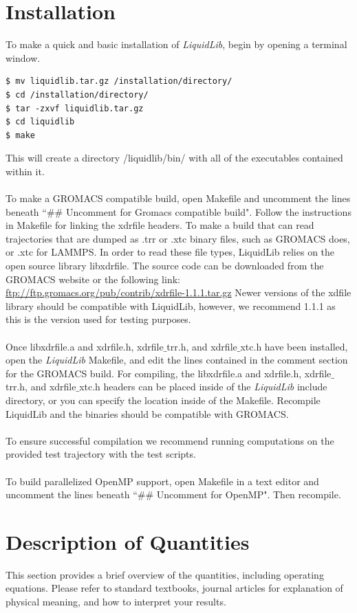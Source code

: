 \documentclass{article}
\begin{document}
\section{Installation}
To make a quick and basic installation of \textit{LiquidLib}, begin by opening a terminal window.
\begin{lstlisting}[style=BashInputStyle]
$ mv liquidlib.tar.gz /installation/directory/
$ cd /installation/directory/
$ tar -zxvf liquidlib.tar.gz
$ cd liquidlib
$ make
\end{lstlisting}
This will create a directory /liquidlib/bin/ with all of the executables contained within it.
\\
\\
To make a GROMACS compatible build, open Makefile and uncomment the lines beneath ``$\#\#$ Uncomment for Gromacs compatible build".  Follow the instructions in Makefile for linking the xdrfile headers. To make a build that can read trajectories that are dumped as .trr or .xtc binary files, such as GROMACS does, or .xtc for LAMMPS.  In order to read these file types, LiquidLib relies on the open source library libxdrfile.  The source code can be downloaded from the GROMACS website or the following link: \url{ftp://ftp.gromacs.org/pub/contrib/xdrfile-1.1.1.tar.gz} Newer versions of the xdfile library should be compatible with LiquidLib, however, we recommend 1.1.1 as this is the version used for testing purposes.
\\
\\
Once libxdrfile.a and xdrfile.h, xdrfile$\_$trr.h, and xdrfile$\_$xtc.h have been installed, open the \textit{LiquidLib} Makefile, and edit the lines contained in the comment section for the GROMACS build.  For compiling, the libxdrfile.a and xdrfile.h, xdrfile$\_$trr.h, and xdrfile$\_$xtc.h headers can be placed inside of the \textit{LiquidLib} include directory, or you can specify the location inside of the Makefile.  Recompile LiquidLib and the binaries should be compatible with GROMACS.
\\
\\
To ensure successful compilation we recommend running computations on the provided test trajectory with the test scripts.
\\
\\
To build parallelized OpenMP support, open Makefile in a text editor and uncomment the lines beneath ``$\#\#$ Uncomment for OpenMP".  Then recompile.


\section{Description of Quantities}
This section provides a brief overview of the quantities, including operating equations. Please refer to standard textbooks, journal articles for explanation of physical meaning, and how to interpret your results.
\end{document}
